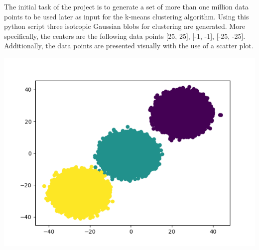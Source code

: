 \documentclass[11pt]{article}
\makeatletter
\def\maxwidth{\ifdim\Gin@nat@width>\linewidth\linewidth
    \else\Gin@nat@width\fi}
\let\Oldincludegraphics\includegraphics
\renewcommand{\includegraphics}[1]{\Oldincludegraphics[width=.8\maxwidth]{#1}}
\makeatother
\begin{document}
The initial task of the project is to generate a set of more than one
million data points to be used later as input for the k-means
clustering algorithm. Using this python script three isotropic Gaussian
blobs for clustering are generated. More specifically, the centers are
the following data points {[}25, 25{]}, {[}-1, -1{]}, {[}-25, -25{]}.
Additionally, the data points are presented visually with the use of a
scatter plot.
\begin{center}
	\includegraphics{../images/data_points.png}\\
\end{center}
\end{document}

